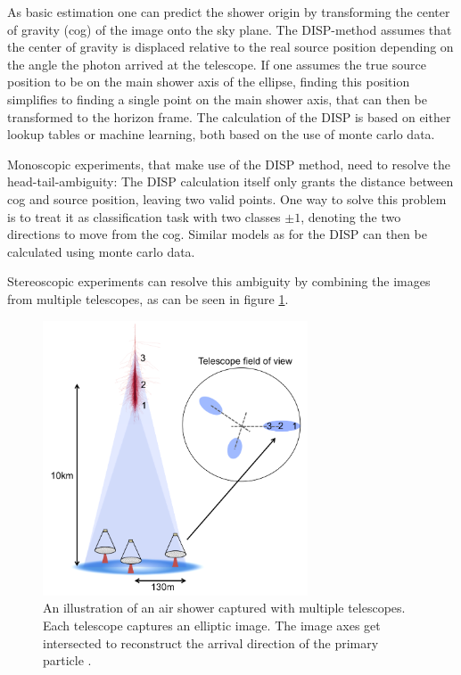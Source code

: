 As basic estimation one can predict the shower origin by 
transforming the center of gravity (cog) of the image onto the sky plane.
The DISP-method assumes that the 
center of gravity is displaced relative to the
real source position depending on the angle the photon arrived at the telescope.
If one assumes the true source position to be on the main shower axis of the ellipse,
finding this position simplifies to finding a single point on the main shower axis, that 
can then be transformed to the horizon frame.
The calculation of the DISP is based on either lookup tables or machine learning,
both based on the use of monte carlo data.

Monoscopic experiments, that make use of the DISP method, need to resolve the head-tail-ambiguity:
The DISP calculation itself only grants the distance between
cog and source position, leaving two valid points.
One way to solve this problem is to treat it as classification task with two
classes $\pm1$, denoting the two directions to move from the cog.
Similar models as for the DISP can then be calculated using monte carlo data.

Stereoscopic experiments can resolve this ambiguity by combining the images from 
multiple telescopes, as can be seen in figure \ref{fig:stereo_shower}.

\begin{figure}
	\centering
	\captionsetup{width=0.9\linewidth}
	\hspace*{0.1\textwidth}\includegraphics[width=0.7\textwidth]{images/stereo_shower.png}
	\caption{An illustration of an air shower captured with multiple telescopes.
		Each telescope captures an elliptic image.
		The image axes get intersected to reconstruct the arrival direction
		of the primary particle \cite{2015arXiv151005675H}.}
	\label{fig:stereo_shower}
\end{figure}

